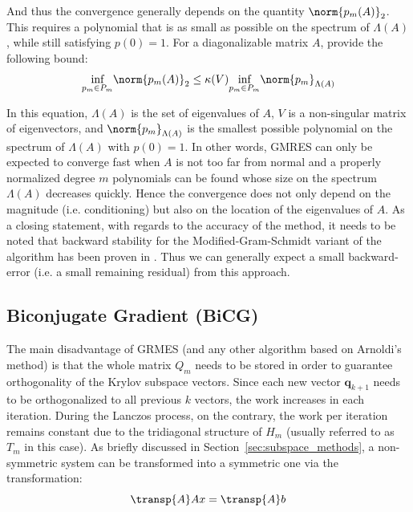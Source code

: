 \noindent And thus the convergence generally depends on the quantity $\norm{p_m(A)}_2$. This requires a polynomial that is as small as possible on the spectrum of $\Lambda(A)$, while still satisfying $p(0)=1$. For a diagonalizable matrix $A$, \cite{trefethen_numerical_1997} provide the following bound:
\begin{equation}
    \underset{p_m \in P_m}{\text{inf}} \norm{p_m(A)}_2 \leq \kappa(V) \underset{p_m \in P_m}{\text{inf}} \norm{p_m}_{\Lambda(A)}
\end{equation}

\noindent In this equation, $\Lambda(A)$ is the set of eigenvalues of $A$, $V$ is a non-singular matrix of eigenvectors, and $\norm{p_m}_{\Lambda(A)}$ is the smallest possible polynomial on the spectrum of $\Lambda(A)$ with $p(0)=1$. In other words, GMRES can only be expected to converge fast when $A$ is not too far from normal and a properly normalized degree $m$ polynomials can be found whose size on the spectrum $\Lambda(A)$ decreases quickly. Hence the convergence does not only depend on the magnitude (i.e. conditioning) but also on the location of the eigenvalues of $A$.
As a closing statement, with regards to the accuracy of the method, it needs to be noted that backward stability for the Modified-Gram-Schmidt variant of the algorithm has been proven in \cite{paige_modified_2006}. Thus we can generally expect a small backward-error (i.e. a small remaining residual) from this approach. 


\subsection{Biconjugate Gradient (BiCG)}
\label{sec:bicg}
The main disadvantage of GRMES (and any other algorithm based on Arnoldi's method) is that the whole matrix $Q_m$ needs to be stored in order to guarantee orthogonality of the Krylov subspace vectors. Since each new vector $\bm{q}_{k+1}$ needs to be orthogonalized to all previous $k$ vectors, the work increases in each iteration. During the Lanczos process, on the contrary, the work per iteration remains constant due to the tridiagonal structure of $H_m$ (usually referred to as $T_m$ in this case). As briefly discussed in Section~\hyperref[sec:subspace_methods]{\ref{sec:subspace_methods}}, a non-symmetric system can be transformed into a symmetric one via the transformation:
\begin{equation}
    \transp{A}Ax=\transp{A}b
\end{equation}

